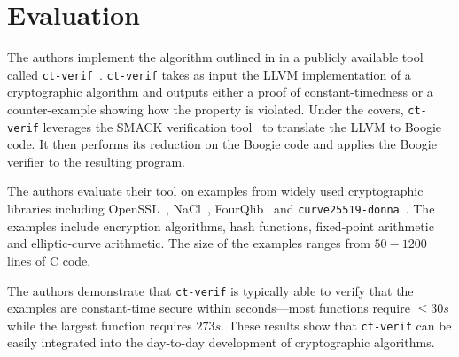 \section{Evaluation}
\label{sec:eval}

The authors implement the algorithm outlined in  in a publicly available tool called \texttt{ct-verif}~\cite{ct-verif-github}. 
\texttt{ct-verif} takes as input the LLVM implementation of a cryptographic algorithm and outputs either a proof of constant-timedness or a counter-example showing how the property is violated. 
Under the covers, \texttt{ct-verif} leverages the SMACK verification tool~\cite{smack} to translate the LLVM to Boogie~\cite{boogie} code. 
It then performs its reduction on the Boogie code and applies the Boogie verifier to the resulting program. 

The authors evaluate their tool on examples from widely used cryptographic libraries including OpenSSL~\cite{openssl}, NaCl~\cite{nacl}, FourQlib~\cite{fourqlib} and \texttt{curve25519-donna}~\cite{donna}. The examples include encryption algorithms, hash functions, fixed-point arithmetic and elliptic-curve arithmetic. 
The size of the examples ranges from $50-1200$ lines of C code.

The authors demonstrate that \texttt{ct-verif} is typically able to verify that the examples are constant-time secure within seconds---most functions require $\leq 30s$ while the largest function requires $273s$. 
These results show that \texttt{ct-verif} can be easily integrated into the day-to-day development of cryptographic algorithms. 